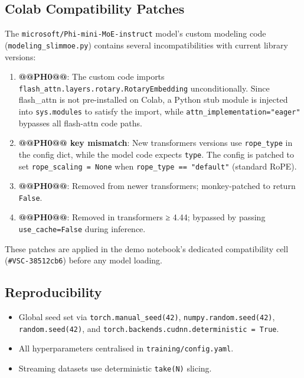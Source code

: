\documentclass[11pt]{article}
\begin{document}
\subsection{Colab Compatibility Patches}


The \texttt{microsoft/Phi-mini-MoE-instruct} model's custom modeling code (\texttt{modeling\_slimmoe.py}) contains several incompatibilities with current library versions:


\begin{enumerate}[leftmargin=*]
\item \textbf{@@PH0@@}: The custom code imports \texttt{flash\_attn.layers.rotary.RotaryEmbedding} unconditionally. Since flash\_attn is not pre-installed on Colab, a Python stub module is injected into \texttt{sys.modules} to satisfy the import, while \texttt{attn\_implementation="eager"} bypasses all flash-attn code paths.
\item \textbf{@@PH0@@ key mismatch}: New transformers versions use \texttt{rope\_type} in the config dict, while the model code expects \texttt{type}. The config is patched to set \texttt{rope\_scaling = None} when \texttt{rope\_type == "default"} (standard RoPE).
\item \textbf{@@PH0@@}: Removed from newer transformers; monkey-patched to return \texttt{False}.
\item \textbf{@@PH0@@}: Removed in transformers ≥ 4.44; bypassed by passing \texttt{use\_cache=False} during inference.

\end{enumerate}
These patches are applied in the demo notebook's dedicated compatibility cell (\texttt{\#VSC-38512cb6}) before any model loading.


\subsection{Reproducibility}


\begin{itemize}[leftmargin=*]
\item Global seed set via \texttt{torch.manual\_seed(42)}, \texttt{numpy.random.seed(42)}, \texttt{random.seed(42)}, and \texttt{torch.backends.cudnn.deterministic = True}.
\item All hyperparameters centralised in \texttt{training/config.yaml}.
\item Streaming datasets use deterministic \texttt{take(N)} slicing.

\end{itemize}
\end{document}
